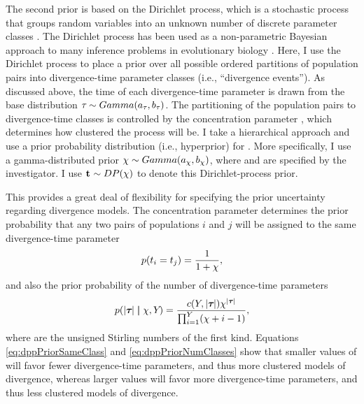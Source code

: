 The second prior is based on the Dirichlet process, which is a stochastic
process that groups random variables into an unknown number of discrete
parameter classes \cite{Ferguson1973,Antoniak1974}.
The Dirichlet process has been used as a non-parametric Bayesian approach to
many inference problems in evolutionary biology
\cite{Lartillot2004,Huelsenbeck2007,HuelsenbeckSuchard2007,Ane2007,Heath2011,Heath2012}.
Here, I use the Dirichlet process to place a prior over all possible ordered
partitions of \npairs{} population pairs into divergence-time parameter classes
(i.e., ``divergence events'').
As discussed above, the time of each divergence-time parameter is drawn from
the base distribution $\tau_{} \sim Gamma(a_{\tau_{}},
b_{\tau_{}})$.
The partitioning of the population pairs to divergence-time classes is
controlled by the concentration parameter \concentrationParam, which determines
how clustered the process will be.
I take a hierarchical approach and use a prior probability
distribution (i.e., hyperprior) for \concentrationParam \cite{Escobar1995}.
More specifically, I use a gamma-distributed prior $\chi \sim
Gamma(a_{\chi}, b_{\chi})$,
where \gammaShape{\concentrationParam} and \gammaScale{\concentrationParam} are
specified by the investigator.
I use $\mathbf{t_{}} \sim DP(\chi )$ to denote this Dirichlet-process
prior.

\begin{linenomath}
This provides a great deal of flexibility for specifying the prior uncertainty
regarding divergence models.
The concentration parameter \concentrationParam determines the prior
probability that any two pairs of populations $i$ and $j$ will be assigned to
the same divergence-time parameter
\begin{equation}
    p(t_{i} = t_{j}) = \frac{1}{1 + \chi},
    \label{eq:dppPriorSameClass}
\end{equation}
and also the prior probability of the number of divergence-time parameters
\begin{equation}
    p(\lvert \boldsymbol{\tau_{}} \rvert \boldsymbol{\mid} \chi, Y_{}) = 
    \frac{c(Y_{}, \lvert \boldsymbol{\tau_{}} \rvert) \chi^{\lvert \boldsymbol{\tau_{}} \rvert}}
    {\prod_{i=1}^{Y_{}}(\chi + i - 1)},
    \label{eq:dppPriorNumClasses}
\end{equation}
where \stirlingFirst{\cdot}{\cdot} are the unsigned Stirling numbers of the
first kind.
Equations \ref{eq:dppPriorSameClass} and \ref{eq:dppPriorNumClasses} show that
smaller values of \concentrationParam will favor fewer divergence-time
parameters, and thus more clustered models of divergence, whereas larger values
will favor more divergence-time parameters, and thus less clustered models of
divergence.
\end{linenomath}

